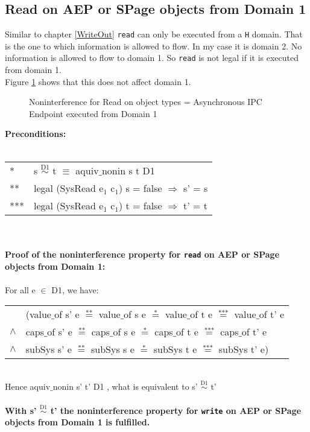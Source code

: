 \subsection{Read on AEP or SPage objects from Domain 1}
Similar to chapter \ref{WriteOut} \texttt{read} can only be executed from a \texttt{H} domain. That is the one to which information is allowed to flow. In my case it is domain 2. No information is allowed to flow to domain 1. So \texttt{read} is not legal if it is executed from domain 1.\\
Figure \ref{fig:ReadOut} shows that this does not affect domain 1. 
\begin{figure}[H]
\caption{Noninterference for Read on object types = Asynchronous IPC Endpoint executed from Domain 1}
\label{fig:ReadOut}
\end{figure} 
\textbf{Preconditions:} \\ \\
\begin{tabular}{ll}
* & s $\overset{\text{D1}}{\sim}$ t $\equiv$ aquiv$\_$nonin s t D1	\\ 
** & legal (SysRead e$_1$ c$_1$) s = false $\Rightarrow$ s' = s \\ 
*** & legal (SysRead e$_1$ c$_1$) t = false $\Rightarrow$ t' = t
\end{tabular} \\ \\ 
\textbf{Proof of the noninterference property for \texttt{read} on AEP or SPage objects from Domain 1:}\\ \\
For all e $\in$ D1, we have: \\ 
\begin{tabular}{ll}
& (value$\_$of s' e $\overset{\text{**}}{=}$ value$\_$of s e $\overset{\text{*}}{=}$ value$\_$of t e $\overset{\text{***}}{=}$ value$\_$of t' e \\
$\wedge$ & caps$\_$of s' e $\overset{\text{**}}{=}$ caps$\_$of s e $\overset{\text{*}}{=}$ caps$\_$of t e $\overset{\text{***}}{=}$ caps$\_$of t' e \\
$\wedge$ & subSys s' e $\overset{\text{**}}{=}$ subSys s e $\overset{\text{*}}{=}$ subSys t e $\overset{\text{***}}{=}$ subSys t' e)
\end{tabular} \\
Hence aquiv$\_$nonin s' t' D1 , what is equivalent to s' $\overset{\text{D1}}{\sim}$ t'\\ \\ 
\textbf{With s' $\overset{\text{D1}}{\sim}$ t' the noninterference property for \texttt{write} on AEP or SPage objects from Domain 1 is fulfilled.}  
\clearpage

